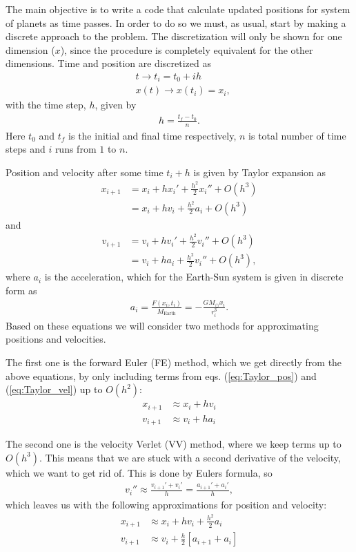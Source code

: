 \documentclass[12pt, a4paper]{article}
\begin{document}
The main objective is to write a code that calculate updated positions for system of planets as time 
passes. In order to do so we must, as usual, start by making a discrete approach to the problem. 
The discretization will only be shown for one dimension ($x$), since the procedure is completely
equivalent for the other dimensions. Time and position are discretized as 
\begin{align*}
&t  \rightarrow t_i = t_0 + ih \\
&x(t)  \rightarrow x(t_i) = x_i, 
\end{align*}   
with the time step, $h$, given by 
\begin{align*}
h = \frac{t_f - t_0}{n}.  
\end{align*}
Here $t_0$ and $t_f$ is the initial and final time respectively, $n$ is total number of time steps and 
$i$ runs from $1$ to $n$. 

Position and velocity after some time $t_i+h$ is given by Taylor expansion as 
\begin{align}
x_{i+1} & = x_i + hx_i' + \frac{h^2}{2}x_i'' + O(h^3) \nonumber \\ 
	    & = x_i + hv_i + \frac{h^2}{2}a_i + O(h^3)
\label{eq:Taylor_pos}	    
\end{align}
and 
\begin{align}
v_{i+1} & = v_i + hv_i' + \frac{h^2}{2}v_i'' + O(h^3) \nonumber \\
		& = v_i + ha_i + \frac{h^2}{2}v_i'' + O(h^3),  
\label{eq:Taylor_vel}
\end{align}
where $a_i$ is the acceleration, which for the Earth-Sun system is given in discrete form as  
\begin{align*}
a_i = \frac{F(x_i,t_i)}{M_{\text{Earth}}} = - \frac{GM_{\odot}x_i}{r_i^3}. 
\end{align*}
Based on these equations we will consider two methods for approximating positions and velocities.

The first one is the forward Euler (FE) method, which we get directly from the above equations, by only 
including terms from eqs. (\ref{eq:Taylor_pos}) and (\ref{eq:Taylor_vel}) up to $O(h^2)$: 
\begin{align*}
x_{i+1} & \approx x_i + hv_i \\ 
v_{i+1} & \approx v_i + ha_i 
\end{align*}


The second one is the velocity Verlet (VV) method, where we keep terms up to $O(h^3)$. This means that 
we are stuck with a second derivative of the velocity, which we want to get rid of. This is done by 
Eulers formula, so 
\begin{align*}
v_i'' \approx \frac{v_{i+1}'+v_i'}{h} = \frac{a_{i+1}'+a_i'}{h},  
\end{align*}
which leaves us with the following approximations for position and velocity: 
\begin{align*}
x_{i+1} & \approx x_i + hv_i + \frac{h^2}{2}a_i  \\
v_{i+1} & \approx v_i + \frac{h}{2}\left[ a_{i+1} + a_i  \right] 
\end{align*}
\end{document}
